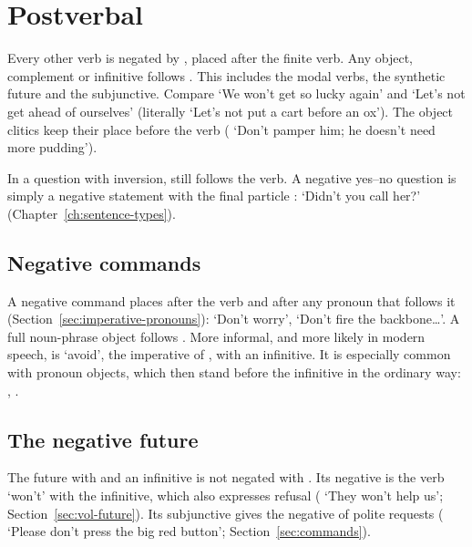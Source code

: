 \section{Postverbal }\label{sec:neg-noc}
Every other verb is negated by , placed after the finite verb. Any object, complement or infinitive follows . This includes the modal verbs, the synthetic future and the subjunctive.
Compare  `We won't get so lucky again' and  `Let's not get ahead of ourselves' (literally `Let's not put a cart before an ox'). The object clitics keep their place before the verb ( `Don't pamper him; he doesn't need more pudding').

In a question with inversion,  still follows the verb. A negative yes--no question is simply a negative statement with the final particle :  `Didn't you call her?' (Chapter~\ref{ch:sentence-types}).

\subsection{Negative commands}
A negative command places  after the verb and after any pronoun that follows it (Section~\ref{sec:imperative-pronouns}):  `Don't worry',  `Don't fire the backbone\ldots'. A full noun-phrase object follows .
More informal, and more likely in modern speech, is  `avoid', the imperative of , with an infinitive. It is especially common with pronoun objects, which then stand before the infinitive in the ordinary way: , .

\subsection{The negative future}
The future with  and an infinitive is not negated with . Its negative is the verb  `won't' with the infinitive, which also expresses refusal ( `They won't help us'; Section~\ref{sec:vol-future}). Its subjunctive  gives the negative of polite requests ( `Please don't press the big red button'; Section~\ref{sec:commands}).

